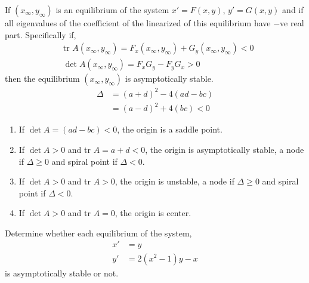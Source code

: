 \documentclass[../main-sheet.tex]{subfiles}
\begin{document}
\begin{thm}
    If \((x_\infty, y_\infty)\) is an equilibrium of the system \(x'=F(x,y)\), \(y'=G(x,y)\) and if all eigenvalues of the coefficient of the linearized of this equilibrium have \(-\)ve real part. Specifically if,
    \begin{align*}
        &\text{tr } A(x_\infty, y_\infty)=F_x(x_\infty, y_\infty)+G_y(x_\infty, y_\infty)<0\\
        &\det A(x_\infty, y_\infty)=F_xG_y-F_yG_x >0
    \end{align*}
    then the equilibrium \((x_\infty, y_\infty)\) is asymptotically stable.
    \begin{align*}
        \Delta&=(a+d)^2-4(ad-bc)\\
        &=(a-d)^2+4(bc)<0
    \end{align*}
    \begin{enumerate}
        \item If \(\det A=(ad-bc)<0\), the origin is a saddle point.
        \item If \(\det A >0\) and tr \(A=a+d<0\), the origin is asymptotically stable, a node if \(\Delta\geq0\) and spiral point if \(\Delta<0\).
        \item If \(\det A >0\) and tr \(A>0\), the origin is unstable, a node if \(\Delta\geq0\) and spiral point if \(\Delta<0\).
        \item If \(\det A >0\) and tr \(A=0\), the origin is center.
    \end{enumerate}
\end{thm}
\begin{prob}
    Determine whether each equilibrium of the system,
    \begin{align*}
        x'&=y\\
        y'&=2(x^2-1)y-x
    \end{align*}
    is asymptotically stable or not.
\end{prob}
\end{document}
